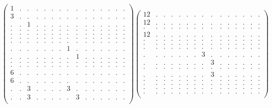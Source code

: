 \documentclass[12pt,a4paper]{amsart}
\begin{document}
\begin{align*}
\left(\begin{array}{rrrrrrrrrrrrrrr}%
1&.&.&.&.&.&.&.&.&.&.&.&.&.&.\\%
3&.&.&.&.&.&.&.&.&.&.&.&.&.&.\\%
.&.&1&.&.&.&.&.&.&.&.&.&.&.&.\\%
.&.&.&.&.&.&.&.&.&.&.&.&.&.&.\\%
.&.&.&.&.&.&.&.&.&.&.&.&.&.&.\\%
.&.&.&.&.&.&.&.&.&.&.&.&.&.&.\\%
.&.&.&.&.&.&.&.&.&.&.&.&.&.&.\\%
.&.&.&.&.&.&.&1&.&.&.&.&.&.&.\\%
.&.&.&.&.&.&.&.&1&.&.&.&.&.&.\\%
.&.&.&.&.&.&.&.&.&.&.&.&.&.&.\\%
.&.&.&.&.&.&.&.&.&.&.&.&.&.&.\\%
6&.&.&.&.&.&.&.&.&.&.&.&.&.&.\\%
6&.&.&.&.&.&.&.&.&.&.&.&.&.&.\\%
.&.&3&.&.&.&.&3&.&.&.&.&.&.&.\\%
.&.&3&.&.&.&.&.&3&.&.&.&.&.&.\\%
\end{array}\right)%
\left(\begin{array}{rrrrrrrrrrrrrrr}%
12&.&.&.&.&.&.&.&.&.&.&.&.&.&.\\%
12&.&.&.&.&.&.&.&.&.&.&.&.&.&.\\%
.&.&.&.&.&.&.&.&.&.&.&.&.&.&.\\%
12&.&.&.&.&.&.&.&.&.&.&.&.&.&.\\%
.&.&.&.&.&.&.&.&.&.&.&.&.&.&.\\%
.&.&.&.&.&.&.&.&.&.&.&.&.&.&.\\%
.&.&.&.&.&.&.&.&.&.&.&.&.&.&.\\%
.&.&.&.&.&.&.&3&.&.&.&.&.&.&.\\%
.&.&.&.&.&.&.&.&3&.&.&.&.&.&.\\%
.&.&.&.&.&.&.&.&.&.&.&.&.&.&.\\%
.&.&.&.&.&.&.&.&3&.&.&.&.&.&.\\%
.&.&.&.&.&.&.&.&.&.&.&.&.&.&.\\%
.&.&.&.&.&.&.&.&.&.&.&.&.&.&.\\%
.&.&.&.&.&.&.&.&.&.&.&.&.&.&.\\%
.&.&.&.&.&.&.&.&.&.&.&.&.&.&.\\%
\end{array}\right)%
\end{align*}
\end{document}
